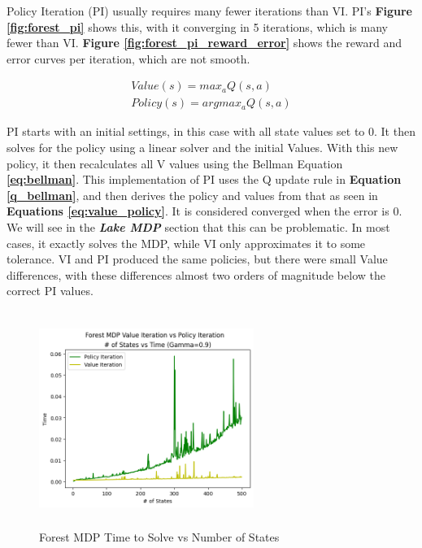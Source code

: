\documentclass[letterpaper]{article} %
\begin{document}
Policy Iteration (PI) usually requires many fewer iterations than VI.  PI's \textbf{Figure \ref{fig:forest_pi}} shows this, with it converging in 5 iterations, which is many fewer than VI.   \textbf{Figure \ref{fig:forest_pi_reward_error}} shows the reward and error curves per iteration, which are not smooth.  

\begin{equation} \label{eq:value_policy}
\begin{gathered}
Value(s) = max_a Q(s,a)\\
Policy(s) = argmax_a Q(s,a)
\end{gathered}
\end{equation}

PI starts with an initial settings, in this case with all state values set to 0.  It then solves for the policy using a linear solver and the initial Values.  With this new policy, it then recalculates all V values using the Bellman Equation \textbf{\ref{eq:bellman}}.  This implementation of PI uses the Q update rule in \textbf{Equation \ref{q_bellman}}, and then derives the policy and values from that as seen in  \textbf{Equations \ref{eq:value_policy}}.  It is considered converged when the error is 0.  We will see in the \textbf{\emph{Lake MDP}} section that this can be problematic.  In most cases, it exactly solves the MDP, while VI only approximates it to some tolerance.  VI and PI produced the same policies, but there were small Value differences, with these differences almost two orders of magnitude below the correct PI values.

\begin{figure}[!htb]
\centering
\includegraphics[width=2.75in, height=2.75in]{Figures/Forest_MDP_Value_Iteration_vs_Policy_Iteration_num_of_States_vs_Time_Gamma_0_9.png}
\caption{Forest MDP Time to Solve vs Number of States}
\label{fig:forest_vi_pi_time}
\end{figure}
\end{document}
